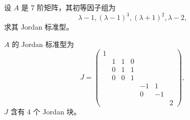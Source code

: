\documentclass[../../main.tex]{subfiles}
\begin{document}
\begin{example}
设 $A$ 是 7 阶矩阵，其初等因子组为
\[
\lambda - 1, (\lambda - 1)^3, (\lambda + 1)^2, \lambda - 2,
\]
求其 Jordan 标准型。
\end{example}
\begin{solution}
$A$ 的 Jordan 标准型为
\[
J = \begin{pmatrix}
1 & & & & & & \\
& 1 & 1 & 0 & & & \\
& 0 & 1 & 1 & & & \\
& 0 & 0 & 1 & & & \\
& & & & -1 & 1 & \\
& & & & 0 & -1 & \\
& & & & & & 2
\end{pmatrix},
\]
$J$ 含有 4 个 Jordan 块。

\end{solution}
\end{document}
